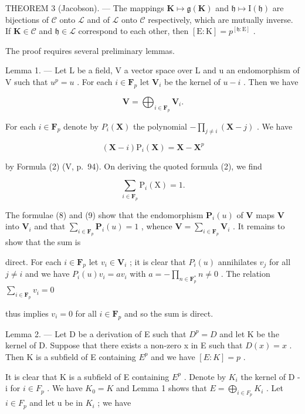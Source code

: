 THEOREM 3 (Jacobson). --- The mappings \(\mathbf{K} \mapsto \mathfrak{g}(\mathbf{K})\) and \(\mathfrak{h} \mapsto \mathrm{I}(\mathfrak{h})\) are bijections of \(\mathcal{C}\) onto \(\mathcal{L}\) and of \(\mathcal{L}\) onto \(\mathcal{C}\) respectively, which are mutually inverse. If \(\mathbf{K} \in \mathcal{C}\) and \(\mathfrak{h} \in \mathcal{L}\) correspond to each other, then \([\mathrm{E}:\mathrm{K}] = p^{[\mathfrak{h}:\mathrm{E}]}\) .

The proof requires several preliminary lemmas.

Lemma 1. --- Let L be a field, V a vector space over L and u an endomorphism of V such that \(u^p = u\) . For each \(i \in \mathbf{F}_p\) let \(\mathbf{V}_i\) be the kernel of \(u - i\) . Then we have

\[
\mathbf {V} = \bigoplus_ {i \in \mathbf {F} _ {p}} \mathbf {V} _ {i}.
\]

For each \(i \in \mathbf{F}_p\) denote by \(P_i(\mathbf{X})\) the polynomial \(-\prod_{j \neq i} (\mathbf{X} - j)\) . We have

\[
(\mathbf {X} - i) \mathrm{P} _ {i} (\mathbf {X}) = \mathbf {X} - \mathbf {X} ^ {p}\tag{8}
\]

by Formula (2) (V, p.~94). On deriving the quoted formula (2), we find

\[
\sum_ {i \in \mathbf {F} _ {p}} \mathrm{P} _ {i} (\mathrm{X}) = 1.\tag{9}
\]

The formulae (8) and (9) show that the endomorphism \(\mathbf{P}_i(u)\) of \(\mathbf{V}\) maps \(\mathbf{V}\) into \(\mathbf{V}_i\) and that \(\sum_{i\in \mathbf{F}_p}\mathbf{P}_i(u) = 1\) , whence \(\mathbf{V} = \sum_{i\in \mathbf{F}_p}\mathbf{V}_i\) . It remains to show that the sum is

direct. For each \(i \in \mathbf{F}_p\) let \(v_i \in \mathbf{V}_i\) ; it is clear that \(P_i(u)\) annihilates \(v_j\) for all \(j \neq i\) and we have \(P_i(u) v_i = av_i\) with \(a = -\prod_{n \in \mathbf{F}_p^*} n \neq 0\) . The relation \(\sum_{i \in \mathbf{F}_p} v_i = 0\)

thus implies \(v_{i} = 0\) for all \(i \in \mathbf{F}_p\) and so the sum is direct.

Lemma 2. --- Let D be a derivation of E such that \(D^{p} = D\) and let K be the kernel of D. Suppose that there exists a non-zero x in E such that \(D(x) = x\) . Then K is a subfield of E containing \(E^{p}\) and we have \([E : K] = p\) .

It is clear that K is a subfield of E containing \(E^{p}\) . Denote by \(K_{i}\) the kernel of D - i for \(i \in F_{p}\) . We have \(K_{0} = K\) and Lemma 1 shows that \(E = \bigoplus_{i \in F_{p}} K_{i}\) . Let \(i \in F_{p}\) and let u be in \(K_{i}\) ; we have

